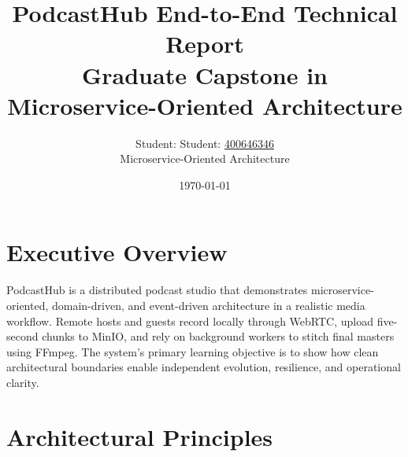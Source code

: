 \documentclass[12pt]{article}
\title{\textbf{PodcastHub End-to-End Technical Report}\\Graduate Capstone in Microservice-Oriented Architecture}
\author{Student: Student: \underline{400646346}\\Microservice-Oriented Architecture}
\date{\today}
\begin{document}
\maketitle
\tableofcontents
\listoftables
\listoffigures
\newpage

\section{Executive Overview}

PodcastHub is a distributed podcast studio that demonstrates microservice-oriented, domain-driven, and event-driven architecture in a realistic media workflow. Remote hosts and guests record locally through WebRTC, upload five-second chunks to MinIO, and rely on background workers to stitch final masters using FFmpeg. The system's primary learning objective is to show how clean architectural boundaries enable independent evolution, resilience, and operational clarity.

\section{Architectural Principles}
\end{document}
